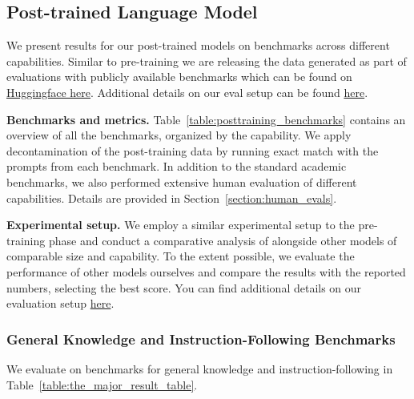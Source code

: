 \subsection{Post-trained Language Model}
\label{section:results_finetuned}

We present results for our \llamathree post-trained models on benchmarks across different capabilities.
Similar to pre-training we are releasing the data generated as part of evaluations with publicly available benchmarks which can be found on \href{https://huggingface.co/meta-llama}{Huggingface here}. Additional details on our eval setup can be found \href{https://github.com/meta-llama/llama-models/blob/main/models/llama3_1/eval_details.md}{here}.

\begin{table}
    \centering
    
    \caption{\textbf{Post-training benchmarks by category.} Overview of all benchmarks we use to evaluate post-trained \llamathree models, ordered by capability. %
    }
    \label{table:posttraining_benchmarks}
\end{table}

\textbf{Benchmarks and metrics.} Table~\ref{table:posttraining_benchmarks} contains an overview of all the benchmarks, organized by the capability.
We apply decontamination of the post-training data by running exact match with the prompts from each benchmark. In addition to the standard academic benchmarks, we also performed extensive human evaluation of different capabilities. Details are provided in Section~\ref{section:human_evals}.

\textbf{Experimental setup.} We employ a similar experimental setup to the pre-training phase and conduct a comparative analysis of \llamathree alongside other models of comparable size and capability. To the extent possible, we evaluate the performance of other models ourselves and compare the results with the reported numbers, selecting the best score.
You can find additional details on our evaluation setup \href{https://github.com/meta-llama/llama-models/blob/main/models/llama3_1/eval_details.md}{here}.

\subsubsection{General Knowledge and Instruction-Following Benchmarks}
We evaluate \llamathree on benchmarks for general knowledge and instruction-following in Table~\ref{table:the_major_result_table}.

